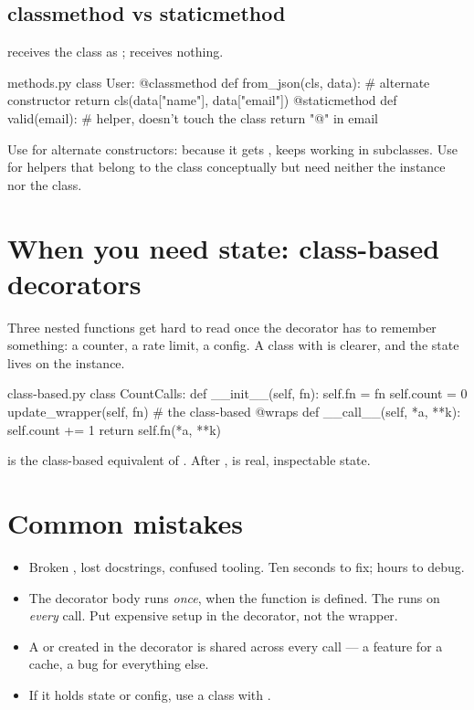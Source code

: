 \subsection{classmethod vs staticmethod}

 receives the class as ;  receives nothing.

\begin{pycard}{methods.py}
class User:
    @classmethod
    def from_json(cls, data):       # alternate constructor
        return cls(data["name"], data["email"])
    @staticmethod
    def valid(email):               # helper, doesn't touch the class
        return "@" in email
\end{pycard}

Use  for alternate constructors: because it gets ,  keeps working in subclasses. Use  for helpers that belong to the class conceptually but need neither the instance nor the class.

\section{When you need state: class-based decorators}

Three nested functions get hard to read once the decorator has to remember something: a counter, a rate limit, a config. A class with  is clearer, and the state lives on the instance.

\begin{pycard}{class-based.py}
class CountCalls:
    def __init__(self, fn):
        self.fn = fn
        self.count = 0
        update_wrapper(self, fn)    # the class-based @wraps
    def __call__(self, *a, **k):
        self.count += 1
        return self.fn(*a, **k)
\end{pycard}

 is the class-based equivalent of . After ,  is real, inspectable state.

\section{Common mistakes}

\begin{itemize}
  \item {} Broken , lost docstrings, confused tooling. Ten seconds to fix; hours to debug.
  \item {} The decorator body runs \emph{once}, when the function is defined. The  runs on \emph{every} call. Put expensive setup in the decorator, not the wrapper.
  \item {} A  or  created in the decorator is shared across every call — a feature for a cache, a bug for everything else.
  \item {} If it holds state or config, use a class with .
\end{itemize}

